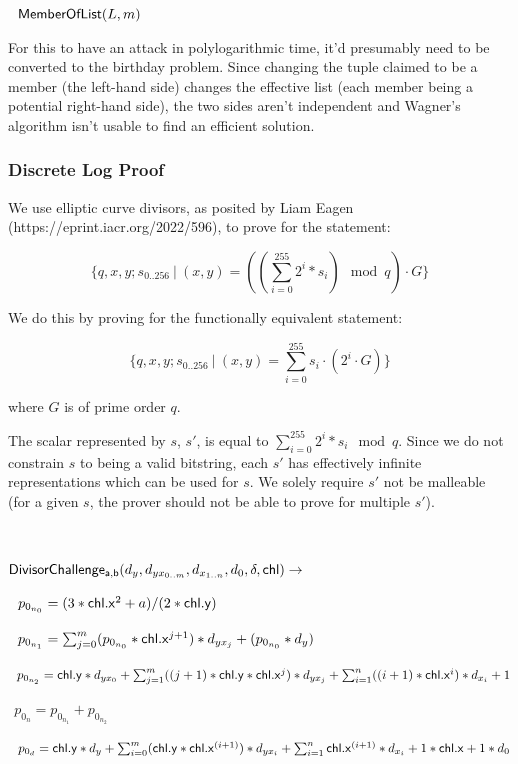 \documentclass[]{article}
\begin{document}
$~~\mathsf{MemberOfList}(L, m)$

For this to have an attack in polylogarithmic time, it'd presumably need to be converted to the birthday problem. Since changing the tuple claimed to be a member (the left-hand side) changes the effective list (each member being a potential right-hand side), the two sides aren't independent and Wagner's algorithm isn't usable to find an efficient solution.

\newpage

\subsubsection{Discrete Log Proof}

We use elliptic curve divisors, as posited by Liam Eagen (https://eprint.iacr.org/2022/596), to prove for the statement:

$$
\{ q, x, y; s_{0..256} ~|~ (x, y) = ((\sum^{255}_{i=0} 2^i * s_i) \mod q) \cdot G \}
$$

We do this by proving for the functionally equivalent statement:

$$
\{ q, x, y; s_{0..256} ~|~ (x, y) = \sum^{255}_{i=0} s_i \cdot (2^i \cdot G) \}
$$

where $G$ is of prime order $q$.

The scalar represented by $s$, $s'$, is equal to $\sum^{255}_{i=0} 2^i * s_i \mod q$. Since we do not constrain $s$ to being a valid bitstring, each $s'$ has effectively infinite representations which can be used for $s$. We solely require $s'$ not be malleable (for a given $s$, the prover should not be able to prove for multiple $s'$).

\

\newcommand{\dloglhs}{\mathsf{DivisorChallenge_{a,b}}}

$\dloglhs(d_y, d_{yx_{0..m}}, d_{x_{1..n}}, d_0, \delta, \chl) \rightarrow$

$~~p_{0_{n_0}} = (3 * \mathsf{chl}\mathsf{.x}^2 + a) / (2 * \mathsf{chl}\mathsf{.y})$

$~~p_{0_{n_1}} = \sum^m_{j=0} (p_{0_{n_0}} * \mathsf{chl}\mathsf{.x}^{j+1}) * d_{yx_j} + (p_{0_{n_0}} * d_y)$

$~~p_{0_{n_2}} = \mathsf{chl}\mathsf{.y} * d_{yx_0} + \sum^m_{j=1} ((j+1) * \mathsf{chl}\mathsf{.y} * \mathsf{chl}\mathsf{.x}^j) * d_{yx_j} + \sum^n_{i=1} ((i+1) * \mathsf{chl}\mathsf{.x}^i) * d_{x_i} + 1$

$~~p_{0_n} = p_{0_{n_1}} + p_{0_{n_2}}$

$~~p_{0_d} = \mathsf{chl}\mathsf{.y} * d_y + \sum^m_{i=0} (\mathsf{chl}\mathsf{.y} * \mathsf{chl}\mathsf{.x}^{(i+1)}) * d_{yx_{i}} + \sum^n_{i=1} \mathsf{chl}\mathsf{.x}^{(i+1)} * d_{x_{i}} + 1 * \mathsf{chl}\mathsf{.x} + 1 * d_0$
\end{document}
